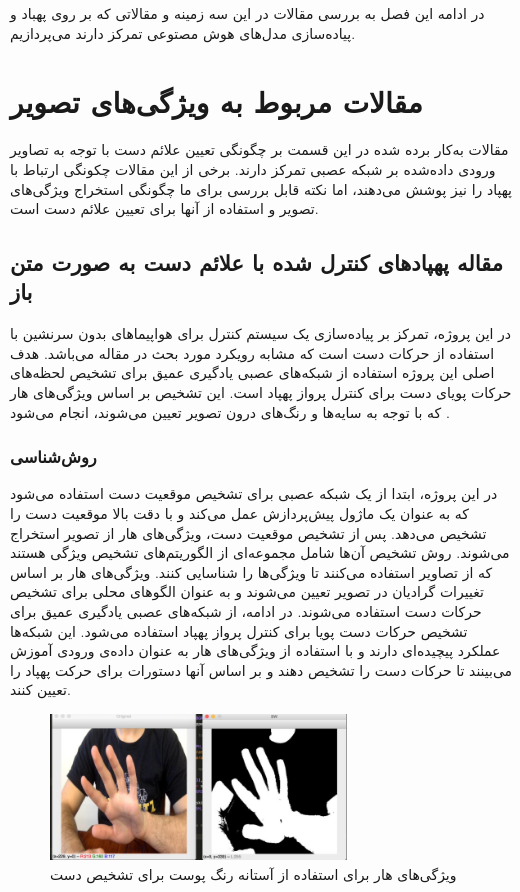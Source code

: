 در ادامه این فصل به بررسی مقالات در این سه زمینه و مقالاتی که بر روی پهباد و پیاده‌سازی مدل‌های هوش مصتوعی تمرکز دارند می‌پردازیم.

\section{مقالات مربوط به ویژگی‌های تصویر}
مقالات به‌کار برده شده در این قسمت بر چگونگی تعیین علائم دست با توجه به تصاویر ورودی داده‌شده بر شبکه عصبی تمرکز دارند. برخی از این مقالات چکونگی ارتباط با پهپاد را نیز پوشش می‌دهند، اما نکته قابل بررسی برای ما چگونگی استخراج ویژگی‌های تصویر و استفاده از آنها برای تعیین علائم دست است.


\subsection[مقاله پهپاد‌های کنترل شده با علائم دست به صورت متن باز]{مقاله پهپاد‌های کنترل شده با علائم دست به صورت متن باز\protect{}}
در این پروژه، تمرکز بر پیاده‌سازی یک سیستم کنترل برای هواپیماهای بدون سرنشین با استفاده از حرکات دست است که مشابه رویکرد مورد بحث در مقاله می‌باشد.
هدف اصلی این پروژه استفاده از شبکه‌های عصبی یادگیری عمیق برای تشخیص لحظه‌های حرکات پویای دست برای کنترل پرواز پهپاد 
است. این تشخیص بر اساس ویژگی‌های هار 
 که با توجه به سایه‌ها و رنگ‌های درون تصویر تعیین می‌شوند، انجام می‌شود \cite{natarajan2018hand}.

\subsubsection{\protect\textbf{روش‌شناسی}}
در این پروژه، ابتدا از یک شبکه عصبی برای تشخیص موقعیت دست استفاده می‌شود که به عنوان یک ماژول پیش‌پردازش عمل می‌کند و با دقت بالا موقعیت دست را تشخیص می‌دهد. پس از تشخیص 
موقعیت دست، ویژگی‌های هار از تصویر استخراج می‌شوند. روش تشخیص آن‌ها شامل مجموعه‌ای از الگوریتم‌های تشخیص ویژگی هستند که از تصاویر استفاده می‌کنند تا ویژگی‌ها را 
شناسایی کنند. ویژگی‌های هار بر اساس تغییرات گرادیان در تصویر تعیین می‌شوند و به عنوان الگوهای محلی برای تشخیص حرکات دست استفاده می‌شوند. در ادامه، از شبکه‌های عصبی یادگیری 
عمیق برای تشخیص حرکات دست پویا برای کنترل پرواز پهپاد استفاده می‌شود. این شبکه‌ها عملکرد پیچیده‌ای دارند و با استفاده از ویژگی‌های هار به عنوان داده‌ی ورودی آموزش می‌بینند تا حرکات دست را 
تشخیص دهند و بر اساس آنها دستورات برای حرکت پهپاد را تعیین کنند.
\begin{figure}[h]
    \centering
    \includegraphics[width=0.7\textwidth]{Haar3.png}
    \caption[ویژگی‌های هار برای استفاده از آستانه رنگ پوست برای تشخیص دست]{ ویژگی‌های هار برای استفاده از آستانه رنگ پوست برای تشخیص دست \cite{natarajan2018hand}}
\end{figure}

